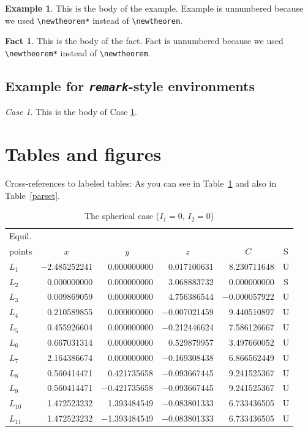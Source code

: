 \documentclass[ps]{imsart}
\theoremstyle{plain}
\theoremstyle{definition}
\newtheorem*{example}{Example}
\newtheorem*{fact}{Fact}
\theoremstyle{remark}
\newtheorem{case}{Case}
\begin{document}
\begin{example}
This is the body of the example. Example is unnumbered because we used \verb|\newtheorem*|
instead of \verb|\newtheorem|.
\end{example}

\begin{fact}
This is the body of the fact. Fact is unnumbered because we used \verb|\newtheorem*|
instead of \verb|\newtheorem|.
\end{fact}


\subsection{Example for \emph{\texttt{remark}}-style environments}
\begin{case}\label{case}
This is the body of Case \ref{case}.
\end{case}


\section{Tables and figures}
Cross-references to labeled tables: As you can see in Table~\ref{sphericcase}
and also in Table~\ref{parset}.

\begin{table}[t]
\caption{The spherical case ($I_1=0$, $I_2=0$)}
\label{sphericcase}
\begin{tabular}{@{}lrrrrc@{}}
\hline
Equil. \\
points & \multicolumn{1}{c}{$x$}
& \multicolumn{1}{c}{$y$} & \multicolumn{1}{c}{$z$}
& \multicolumn{1}{c}{$C$} & S \\
\hline
$L_1$    & $-$2.485252241 & 0.000000000  & 0.017100631  & 8.230711648  & U \\
$L_2$    & 0.000000000  & 0.000000000  & 3.068883732  & 0.000000000  & S \\
$L_3$    & 0.009869059  & 0.000000000  & 4.756386544  & $-$0.000057922 & U \\
$L_4$    & 0.210589855  & 0.000000000  & $-$0.007021459 & 9.440510897  & U \\
$L_5$    & 0.455926604  & 0.000000000  & $-$0.212446624 & 7.586126667  & U \\
$L_6$    & 0.667031314  & 0.000000000  & 0.529879957  & 3.497660052  & U \\
$L_7$    & 2.164386674  & 0.000000000  & $-$0.169308438 & 6.866562449  & U \\
$L_8$    & 0.560414471  & 0.421735658  & $-$0.093667445 & 9.241525367  & U \\
$L_9$    & 0.560414471  & $-$0.421735658 & $-$0.093667445 & 9.241525367  & U \\
$L_{10}$ & 1.472523232  & 1.393484549  & $-$0.083801333 & 6.733436505  & U \\
$L_{11}$ & 1.472523232  & $-$1.393484549 & $-$0.083801333 & 6.733436505  & U \\
\hline
\end{tabular}
\end{table}
\end{document}
